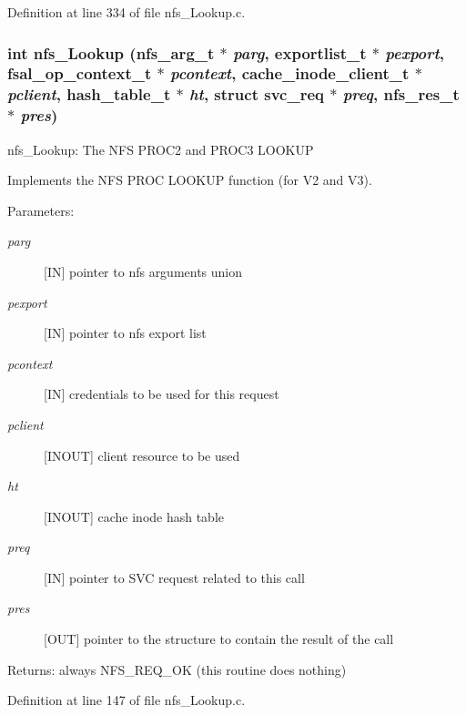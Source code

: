 Definition at line 334 of file nfs\_\-Lookup.c.
\subsubsection[{nfs\_\-Lookup}]{\setlength{\rightskip}{0pt plus 5cm}int nfs\_\-Lookup (nfs\_\-arg\_\-t $\ast$ {\em parg}, \/  exportlist\_\-t $\ast$ {\em pexport}, \/  fsal\_\-op\_\-context\_\-t $\ast$ {\em pcontext}, \/  cache\_\-inode\_\-client\_\-t $\ast$ {\em pclient}, \/  hash\_\-table\_\-t $\ast$ {\em ht}, \/  struct svc\_\-req $\ast$ {\em preq}, \/  nfs\_\-res\_\-t $\ast$ {\em pres})}\label{nfs__Lookup_8c_9b9787324c806ff072b3da95293efd01}


nfs\_\-Lookup: The NFS PROC2 and PROC3 LOOKUP

Implements the NFS PROC LOOKUP function (for V2 and V3).

\begin{Desc}
\item[Parameters:]
\begin{description}
\item[{\em parg}][IN] pointer to nfs arguments union \item[{\em pexport}][IN] pointer to nfs export list \item[{\em pcontext}][IN] credentials to be used for this request \item[{\em pclient}][INOUT] client resource to be used \item[{\em ht}][INOUT] cache inode hash table \item[{\em preq}][IN] pointer to SVC request related to this call \item[{\em pres}][OUT] pointer to the structure to contain the result of the call\end{description}
\end{Desc}
\begin{Desc}
\item[Returns:]always NFS\_\-REQ\_\-OK (this routine does nothing) \end{Desc}


Definition at line 147 of file nfs\_\-Lookup.c.